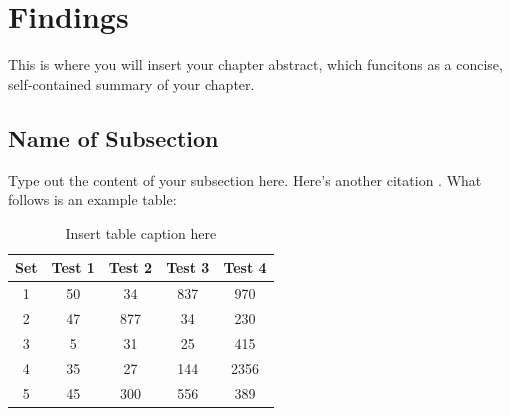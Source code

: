 \chapter{Findings} %

\begin{chapterabstract}

This is where you will insert your chapter abstract, which funcitons as a concise, self-contained summary of your chapter.


\end{chapterabstract}


\section{Name of Subsection}
Type out the content of your subsection here. Here's another citation \citep{Einstein:1933gu,Tho98w}. What follows is an example table:

\begin{table}[h]
\caption{Insert table caption here} %
\centering %
\begin{tabular}{c c c c c} %
\hline\hline %
Set & Test 1 & Test 2 & Test 3 & Test 4 \\ [0.5ex] %
\hline %
1 & 50 & 34 & 837 & 970 \\ %
2 & 47 & 877 & 34 & 230 \\
3 & 5 & 31 & 25 & 415 \\
4 & 35 & 27 & 144 & 2356 \\
5 & 45 & 300 & 556 & 389 \\ [1ex] %
\hline %
\end{tabular}
\label{table_example_1:nonlin} %
\end{table}

